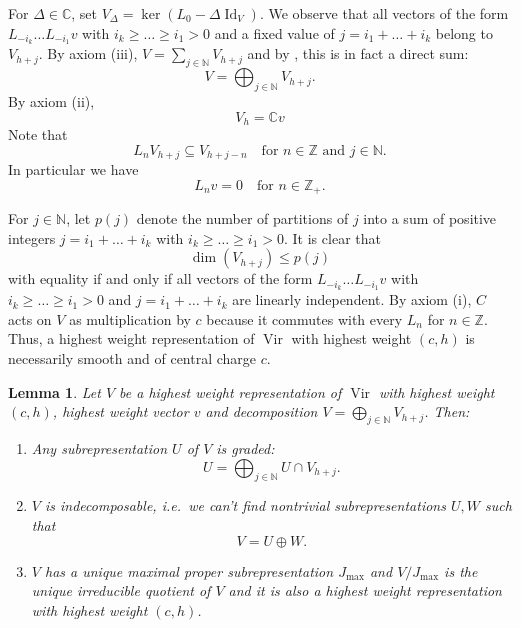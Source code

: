 \documentclass[a4paper, 12pt, reqno]{amsart}
\newtheorem{lemma}[theorem]{Lemma}
\theoremstyle{remark}
\numberwithin{equation}{subsection}
\DeclareMathOperator{\Vir}{Vir}
\DeclareMathOperator{\Id}{Id}
\begin{document}
For $\Delta \in \mathbb{C}$, set $V_{\Delta} = \ker(L_0 - \Delta\Id_V)$.
We observe that all vectors of the form $L_{-i_k}\dots L_{-i_1}v$ with $i_k \ge \dots \ge i_1 > 0$ and a fixed value of $j = i_1 + \dots + i_k$ belong to $V_{h + j}$.
By axiom (iii), $V = \sum_{j \in \mathbb{N}}V_{h + j}$ and by , this is in fact a direct sum:
\begin{equation}
  \label{eq:29}
  V = \bigoplus_{j \in \mathbb{N}}V_{h + j}.
\end{equation}
By axiom (ii),
\begin{equation}
  \label{eq:30}
  V_h = \mathbb{C}v
\end{equation}
Note that
\begin{equation}
  \label{eq:31}
  L_nV_{h + j}\subseteq V_{h + j - n} \quad \text{for }n \in \mathbb{Z}\text{ and }j \in \mathbb{N}.
\end{equation}
In particular we have
\begin{equation}
  \label{eq:32}
  L_nv = 0 \quad \text{for } n \in \mathbb{Z}_+.
\end{equation}

For $j \in \mathbb{N}$, let $p(j)$ denote the number of partitions of $j$ into a sum of positive integers $j = i_1 + \dots + i_k$ with $i_k \ge \dots \ge i_1 > 0$.
It is clear that
\begin{equation}
  \label{eq:33}
  \dim(V_{h + j}) \le p(j)
\end{equation}
with equality if and only if all vectors of the form $L_{-i_k}\dots L_{-i_1}v$ with $i_k \ge \dots \ge i_1 > 0$ and $j = i_1 + \dots + i_k$ are linearly independent.
By axiom (i), $C$ acts on $V$ as multiplication by $c$ because it commutes with every $L_n$ for $n \in \mathbb{Z}$.
Thus, a highest weight representation of $\Vir$ with highest weight $(c, h)$ is necessarily smooth and of central charge $c$.

\begin{lemma}
  \label{lmm:9}
  Let $V$ be a highest weight representation of $\Vir$ with highest weight $(c, h)$, highest weight vector $v$ and decomposition $V = \bigoplus_{j \in \mathbb{N}}V_{h + j}$.
  Then:
  \begin{enumerate}
  \item Any subrepresentation $U$ of $V$ is graded:
    \begin{equation*}
      U = \bigoplus_{j \in \mathbb{N}}U \cap V_{h + j}.
    \end{equation*}
  \item $V$ is indecomposable, i.e.\ we can't find nontrivial subrepresentations $U, W$ such that
    \begin{equation*}
      V = U \oplus W.
    \end{equation*}
  \item $V$ has a unique maximal proper subrepresentation $J_{\max}$ and $V/J_{\max}$ is the unique irreducible quotient of $V$ and it is also a highest weight representation with highest weight $(c, h)$.
  \end{enumerate}
\end{lemma}
\end{document}
